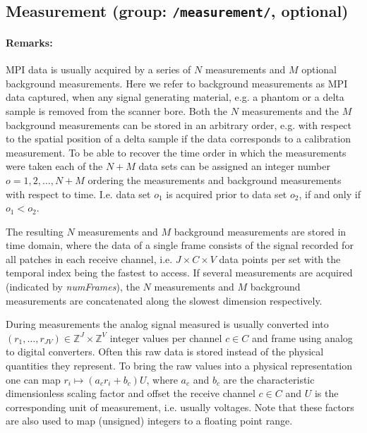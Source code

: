 \documentclass[landscape,a4paper]{article} %
\newcommand{\inl}[1]{\lstinline[columns=fixed]{#1}}
\begin{document}
\subsection{Measurement (group: \inl{/measurement/}, optional)}
\begin{multicols}{2}

\paragraph{Remarks:}
MPI data is usually acquired by a series of $N$ measurements and $M$ optional background measurements. Here we refer to background measurements as MPI data captured, when any signal generating material, e.g. a phantom or a delta sample is removed from the scanner bore. Both the $N$ measurements and the $M$ background measurements can be stored in an arbitrary order, e.g. with respect to the spatial position of a delta sample if the data corresponds to a calibration measurement. To be able to recover the time order in which the measurements were taken each of the $N+M$ data sets can be assigned an integer number $o = 1,2,\dots,N+M$ ordering the measurements and background measurements with respect to time. I.e. data set $o_1$ is acquired prior to data set $o_2$, if and only if $o_1 < o_2$.

The resulting $N$ measurements and $M$ background measurements are stored in time domain, where the data of a single frame consists of the signal recorded for all patches in each receive channel, i.e. $J \times C \times V$ data points per set with the temporal index being the fastest to access. If several measurements are acquired (indicated by \textit{numFrames}), the $N$ measurements and $M$ background measurements are concatenated along the slowest dimension respectively.

During measurements the analog signal measured is usually converted into $(r_1,\dots,r_{JV}) \in \mathbb Z^J \times \mathbb Z^V$ integer values per channel $c \in C$ and frame using analog to digital converters. Often this raw data is stored instead of the physical quantities they represent. To bring the raw values into a physical representation one can map $r_i \mapsto (a_c r_i + b_c) U$, where $a_c$ and $b_c$ are the characteristic dimensionless scaling factor and offset the receive channel $c \in C$ and $U$ is the corresponding unit of measurement, i.e. usually voltages. Note that these factors are also used to map (unsigned) integers to a floating point range.
\end{multicols}
\end{document}
